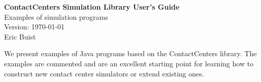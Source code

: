 \documentclass[twoside,12pt]{article}
\begin{document}
\begin{titlepage}

\null\vfill
\begin {center}
{\Large\bf ContactCenters Simulation Library User's Guide } \\[20pt]
{\Large Examples of simulation programs} \\[20pt]
 Version: \today \\
\vfill
 {\sc Eric Buist}
\vfill
\end {center}

\vfill
We present examples of Java programs based on the ContactCenters library.
The examples are commented and are an excellent starting point for
learning how to construct new contact center simulators or extend existing ones.
\end{titlepage}

\tableofcontents
{}














\end{document}

